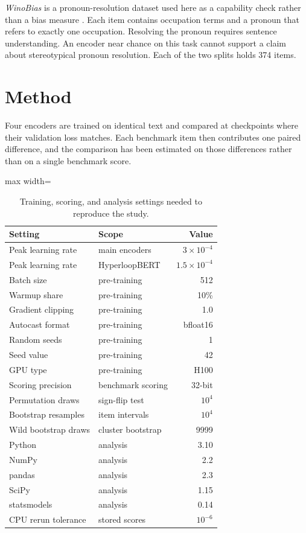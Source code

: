 \documentclass[sigconf,natbib=true,anonymous=true]{acmart}
\begin{document}
\emph{WinoBias} is a pronoun-resolution dataset used here as a capability check
rather than a bias measure \citep{zhao2018winobias}. Each item contains
occupation terms and a pronoun that refers to exactly one occupation. Resolving
the pronoun requires sentence understanding. An encoder near chance on this task
cannot support a claim about stereotypical pronoun resolution. Each of the two splits holds
374 items.

\section{Method}
\label{sec:method}

Four encoders are trained on identical text and compared at checkpoints where
their validation loss matches. Each benchmark item then contributes one paired
difference, and the comparison has been estimated on those differences rather than on a
single benchmark score.

\begin{table}[!htp]
\centering
\caption{Training, scoring, and analysis settings needed to reproduce the study.}
\label{tab:reprosettings}
\footnotesize
\begin{adjustbox}{max width=\columnwidth}
\begin{tabular}{llr}
\toprule
Setting & Scope & Value \\
\midrule
Peak learning rate & main encoders & $3 \times 10^{-4}$ \\
Peak learning rate & HyperloopBERT & $1.5 \times 10^{-4}$ \\
Batch size & pre-training & 512 \\
Warmup share & pre-training & 10\% \\
Gradient clipping & pre-training & 1.0 \\
Autocast format & pre-training & bfloat16 \\
Random seeds & pre-training & 1 \\
Seed value & pre-training & 42 \\
GPU type & pre-training & H100 \\
Scoring precision & benchmark scoring & 32-bit \\
Permutation draws & sign-flip test & $10^4$ \\
Bootstrap resamples & item intervals & $10^4$ \\
Wild bootstrap draws & cluster bootstrap & 9999 \\
Python & analysis & 3.10 \\
NumPy & analysis & 2.2 \\
pandas & analysis & 2.3 \\
SciPy & analysis & 1.15 \\
statsmodels & analysis & 0.14 \\
CPU rerun tolerance & stored scores & $10^{-6}$ \\
\bottomrule
\end{tabular}
\end{adjustbox}
\end{table}
\end{document}
